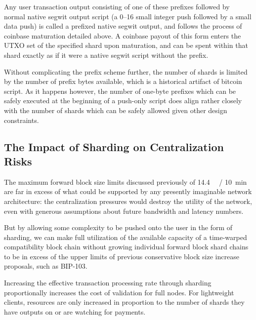 
Any user transaction output consisting of one of these prefixes
followed by normal native segwit output script (a \numrange{0}{16}
small integer push followed by a small data push) is called a prefixed
native segwit output, and follows the process of coinbase maturation
detailed above.  A coinbase payout of this form enters the UTXO set of
the specified shard upon maturation, and can be spent within that
shard exactly as if it were a native segwit script without the prefix.

Without complicating the prefix scheme further, the number of shards
is limited by the number of prefix bytes available, which is a
historical artifact of bitcoin script.  As it happens however, the
number of one-byte prefixes which can be safely executed at the
beginning of a push-only script does align rather closely with the
number of shards which can be safely allowed given other design
constraints.

\subsection{The Impact of Sharding on Centralization Risks}

The maximum forward block size limits discussed previously
of \SI{14.4}{\giga\weight} / \SI{10}{\minute} are far in excess of
what could be supported by any presently imaginable network
architecture: the centralization pressures would destroy the utility
of the network, even with generous assumptions about future bandwidth
and latency numbers.

But by allowing some complexity to be pushed onto the user in the form
of sharding, we can make full utilization of the available capacity of
a time-warped compatibility block chain without growing individual
forward block shard chains to be in excess of the upper limits of
previous conservative block size increase proposals, such as BIP-103.

Increasing the effective transaction processing rate through sharding
proportionally increases the cost of validation for full nodes.  For
lightweight clients, resources are only increased in proportion to the
number of shards they have outputs on or are watching for payments.

